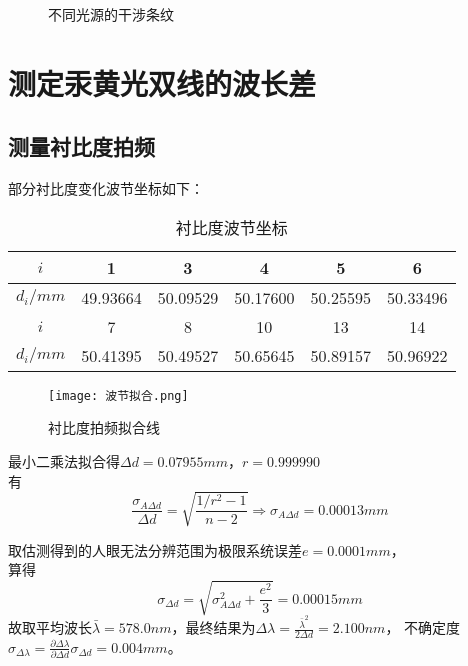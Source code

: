 \documentclass[12pt, a4paper]{ctexart}
\begin{document}
\begin{figure}[htbp]
    \centering
    \caption{不同光源的干涉条纹}
\end{figure}

\section{测定汞黄光双线的波长差}
\subsection{测量衬比度拍频}

部分衬比度变化波节坐标如下：

\begin{table}[htbp]
  \centering
  \caption{衬比度波节坐标}
    \begin{tabular}{cccccc}
    \toprule
    $i$     & 1     & 3     & 4     & 5     & 6  \\
    \hline
    $d_{i}/mm$ & 49.93664 & 50.09529 & 50.17600 & 50.25595 & 50.33496 \\
    \midrule
    $i$     & 7     & 8     & 10    & 13    & 14 \\
    \hline
    $d_{i}/mm$ & 50.41395 & 50.49527 & 50.65645 & 50.89157 & 50.96922 \\
    \bottomrule
    \end{tabular}
  \label{tab:t1}
\end{table}

\begin{figure}
    \centering
    \texttt{[image: 波节拟合.png]}
    \caption{衬比度拍频拟合线}
\end{figure}

最小二乘法拟合得$\Delta d = 0.07955 mm$，$r = 0.999990$\\
有\[ \frac{\sigma_{A \Delta d}}{\Delta d} = \sqrt{\frac{1/r^2 - 1}{n - 2}} \Rightarrow \sigma_{A \Delta d} = 0.00013mm \]

取估测得到的人眼无法分辨范围为极限系统误差$e = 0.0001mm$，\\
算得\[ \sigma_{\Delta d} = \sqrt{\sigma_{A \Delta d}^2 + \frac{e^2}{3}} = 0.00015 mm \]
故取平均波长$\bar{\lambda} = 578.0nm$，最终结果为$\Delta \lambda = \frac{\bar{\lambda}^2}{2 \Delta d} = 2.100nm$，
不确定度$\sigma_{\Delta \lambda} = \frac{\partial \Delta \lambda}{\partial \Delta d} \sigma_{\Delta d} = 0.004mm$。
\end{document}

